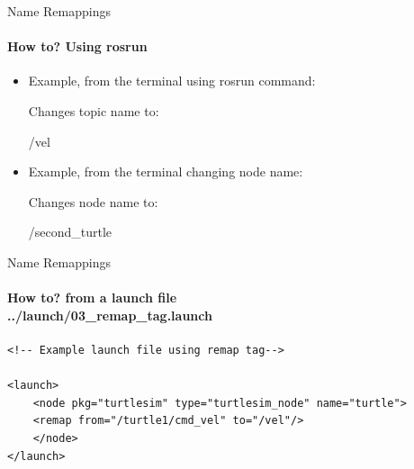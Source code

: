 \documentclass{beamer}
\begin{document}
\begin{frame}[plain]{Name Remappings}
    \framesubtitle{How to? Using rosrun}
    \begin{itemize}     
        \item Example, from the terminal using {\ttfamily \colorbox{gray!30!white}{rosrun}} command:
        \begin{terminal}
            \color{green} \fontsize{8}{1} 
        \end{terminal} 
        
                        
                        Changes topic name to:
                        \begin{focus}
                            /vel  
                        \end{focus}


        \item Example, from the terminal changing node name:
        \begin{terminal}
            \color{green} \fontsize{8}{1} 
        \end{terminal} 
        
        
        Changes node name to:
        \begin{focus}
        /second\_turtle
        \end{focus}                        
    \end{itemize}  
\end{frame}



\begin{frame}[fragile]{Name Remappings}
    \framesubtitle{How to? from a launch file\\
        \vspace{0.2cm}
        ../launch/03\_remap\_tag.launch
        }
      \begin{lstlisting}
<!-- Example launch file using remap tag-->

<launch>
    <node pkg="turtlesim" type="turtlesim_node" name="turtle">
    <remap from="/turtle1/cmd_vel" to="/vel"/>
    </node>
</launch>
      \end{lstlisting}  
\end{frame}
\end{document}
